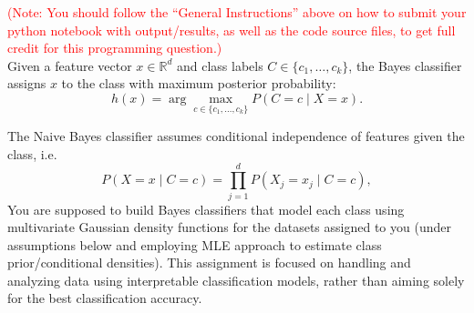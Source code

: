 \documentclass[solution,addpoints,12pt]{exam}
\newcommand{\red}[1]{\textcolor{red}{#1}}
\begin{document}
\begin{questions}


\red{(Note: You should follow the ``General Instructions'' above on how to submit your python notebook with output/results, as well as the code source files, to get full credit for this programming question.)}\\
Given a feature vector $x \in \mathbb{R}^d$ and class labels $C \in \{c_1, \dots, c_k\}$, the Bayes classifier assigns $x$ to the class with maximum posterior probability:
\[
h(x) = \arg\max_{c \in \{c_1, \dots, c_k\}} P(C=c \mid X=x).
\]

The Naive Bayes classifier assumes conditional independence of features given the class, i.e. 
\[
P(X=x \mid C=c) = \prod_{j=1}^d P(X_j = x_j \mid C=c),
\]
You are supposed to build Bayes classifiers that model each class using multivariate Gaussian density functions for the datasets assigned to you (under assumptions below and employing MLE approach to estimate class prior/conditional densities). This assignment is focused on handling and analyzing data using interpretable classification models, rather than aiming solely for the best classification accuracy. 
    

\end{questions}
\end{document}
